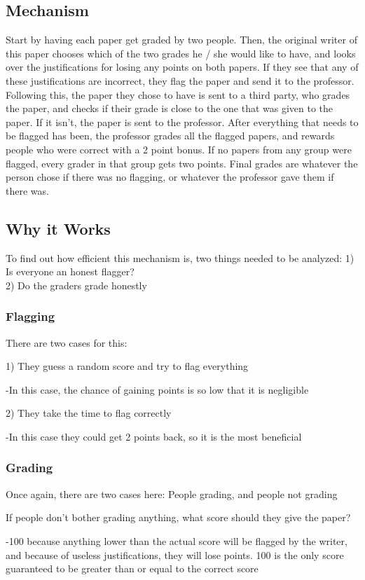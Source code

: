 \documentclass[12pt, Arial]{article}
\begin{document}
\subsection{Mechanism}
Start by having each paper get graded by two people. Then, the original writer of this paper chooses which of the two grades he / she would like to have, and looks over the justifications for losing any points on both papers. If they see that any of these justifications are incorrect, they flag the paper and send it to the professor. Following this, the paper they chose to have is sent to a third party, who grades the paper, and checks if their grade is close to the one that was given to the paper. If it isn't, the paper is sent to the professor. After everything that needs to be flagged has been, the professor grades all the flagged papers, and rewards people who were correct with a 2 point bonus. If no papers from any group were flagged, every grader in that group gets two points. Final grades are whatever the person chose if there was no flagging, or whatever the professor gave them if there was.
\subsection{Why it Works}
To find out how efficient this mechanism is, two things needed to be analyzed:
1) Is everyone an honest flagger?
$$$$
2) Do the graders grade honestly
\subsubsection{Flagging}
There are two cases for this:

1) They guess a random score and try to flag everything

-In this case, the chance of gaining points is so low that it is negligible

2) They take the time to flag correctly

-In this case they could get 2 points back, so it is the most beneficial
\subsubsection{Grading}
Once again, there are two cases here: People grading, and people not grading

If people don't bother grading anything, what score should they give the paper?

-100 because anything lower than the actual score will be flagged by the writer, and because of useless justifications, they will lose points. 100 is the only score guaranteed to be greater than or equal to the correct score
\end{document}
